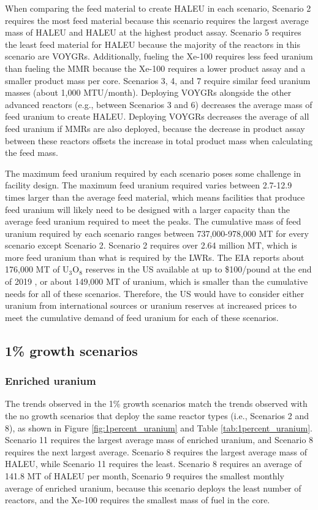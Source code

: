 When comparing the feed material to create \gls{HALEU} in each scenario, 
Scenario 2 requires the most feed material because this scenario 
requires the largest average mass of \gls{HALEU} and \gls{HALEU} at the 
highest product assay. Scenario 5 requires the least feed material for 
\gls{HALEU} because the majority of 
the reactors in this scenario are VOYGRs.
Additionally, fueling the Xe-100 requires less feed uranium than fueling 
the \gls{MMR} because the Xe-100 requires a lower product assay and a 
smaller product mass per core. 
Scenarios 3, 4, and 7 require similar feed uranium masses (about 1,000 
MTU/month). Deploying VOYGRs alongside the other advanced 
reactors (e.g., between Scenarios 3 and 6) decreases the average 
mass of feed uranium to create \gls{HALEU}. Deploying VOYGRs decreases the 
average of all feed uranium if \glspl{MMR} are also deployed, because the 
decrease in product assay between these reactors offsets the increase in 
total product mass when calculating the feed mass. 

The maximum feed uranium required by each scenario poses some 
challenge in facility design. The maximum feed uranium required varies 
between 2.7-12.9 times larger than the average feed material, which means 
facilities that produce feed uranium will likely need to be designed with a 
larger capacity than the average feed uranium required to meet the peaks. 
The cumulative mass of feed uranium required by each scenario ranges between 
737,000-978,000 MT for every scenario except Scenario 2. 
Scenario 2 requires over 2.64 million MT, which is more feed uranium 
than what is required by the \glspl{LWR}. The \gls{EIA} reports 
about 176,000 MT of U$_3$O$_8$ reserves in the US available at up to 
\$100/pound at the end of 2019 \cite{us_energy_information_administration_2020_2021}, 
or about 
149,000 MT of uranium, which is smaller than the cumulative needs for 
all of these scenarios. Therefore, the US would have to consider either uranium 
from international sources or uranium reserves at increased 
prices to meet the cumulative demand of feed 
uranium for each of these scenarios.

\subsection{1\% growth scenarios}
\subsubsection{Enriched uranium}
The trends observed in the 1\% growth scenarios match the trends 
observed with the no growth scenarios that deploy the same reactor 
types (i.e., Scenarios 2 and 8), as shown in 
Figure \ref{fig:1percent_uranium} and Table \ref{tab:1percent_uranium}. 
Scenario 11 requires the largest average mass of enriched uranium, and Scenario
8 requires the next largest average. Scenario 8 requires the largest 
average mass of \gls{HALEU}, while Scenario 11 requires the least. Scenario 
8 requires an average of 141.8 MT of \gls{HALEU} per month, Scenario 
9 requires the 
smallest monthly average of enriched uranium, because this scenario 
deploys the least number of reactors, and the Xe-100 requires the smallest 
mass of fuel in the core. 


